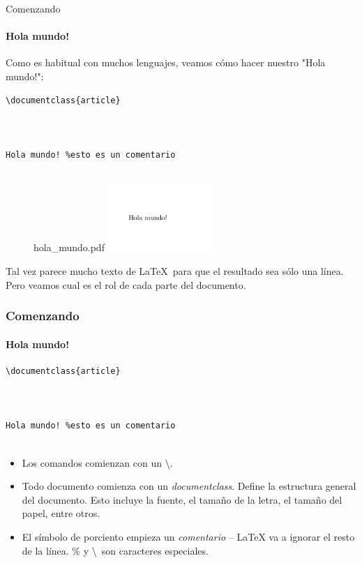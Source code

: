 \begin{frame}[fragile]{Comenzando}
\framesubtitle{Hola mundo!}

Como es habitual con muchos lenguajes, veamos cómo hacer nuestro "Hola mundo!":

\begin{multicols}{2}
\begin{lstlisting}[title={hola\_mundo.tex}]
\documentclass{article}



Hola mundo! %esto es un comentario


\end{lstlisting}

\begin{figure}
hola\_mundo.pdf
\includegraphics[width=0.35\textwidth]{../images/ejemplo_hola_mundo.png}
\end{figure}

\end{multicols}
\pause
Tal vez parece mucho texto de \LaTeX\ para que el resultado sea sólo una línea. Pero veamos cual es el rol de cada parte del documento.

\end{frame}

\begin{frame}[fragile]
\frametitle{Comenzando}
\framesubtitle{Hola mundo!}

\begin{multicols}{2}
\begin{lstlisting}[title={hola\_mundo.tex}]
\documentclass{article}



Hola mundo! %esto es un comentario


\end{lstlisting}
\vspace*{\fill}
\columnbreak

\begin{itemize}
    \item Los comandos comienzan con un \textbackslash.
    \item Todo documento comienza con un \textit{documentclass}. Define la estructura general del documento. Esto incluye la fuente, el tamaño de la letra, el tamaño del papel, entre otros.    
    \item El símbolo de porciento empieza un \emph{comentario} -- \LaTeX{} va a ignorar el resto de la línea. \% y \textbackslash\ son caracteres especiales.
\end{itemize}

\end{multicols}
\end{frame}

